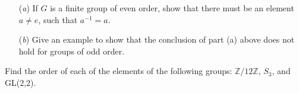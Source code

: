 \documentclass[12pt,letterpaper,boxed]{hmcpset}
\begin{document}
\begin{solution}
\end{solution}

\clearpage


\begin{problem}[2.2.4]
\begin{itemize}
  \item[(\textit{a})] If $G$ is a finite group of even order, show that there must be an element $a \neq e$, such that $a^{-1} = a$.
  
  \item[(\textit{b})] Give an example to show that the conclusion of part (a) above does not hold for groups of odd order. 
\end{itemize}
\end{problem}

\begin{solution}
\end{solution}

\clearpage

\begin{problem}[2.3.1]
Find the order of each of the elements of the following groups: $\mathbb{Z}/12\mathbb{Z}$, $S_3$, and GL(2,2).
\end{problem}

\begin{solution}

\end{solution}
\end{document}
